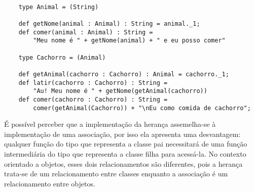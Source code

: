 \begin{lstlisting}[caption={Herança em Programação Funcional},label=fpinheritance]
    
    type Animal = (String)

    def getNome(animal : Animal) : String = animal._1;
    def comer(animal : Animal) : String = 
        "Meu nome é " + getNome(animal) + " e eu posso comer"

    type Cachorro = (Animal)

    def getAnimal(cachorro : Cachorro) : Animal = cachorro._1;
    def latir(cachorro : Cachorro) : String = 
        "Au! Meu nome é " + getNome(getAnimal(cachorro))
    def comer(cachorro : Cachorro) : String = 
        comer(getAnimal(Cachorro)) + "\nEu como comida de cachorro";

\end{lstlisting}

É possível perceber que a implementação da herança 
assemelha-se à implementação de uma associação, 
por isso ela apresenta uma desvantagem: 
qualquer função do tipo que representa 
a classe pai necessitará de uma função 
intermediária do tipo que representa a classe 
filha para acessá-la. 
No contexto orientado a objetos, esses dois 
relacionamentos são diferentes, pois a 
herança trata-se de um relacionamento entre 
classes enquanto a associação é um relacionamento 
entre objetos\cite{umlsystems}. 